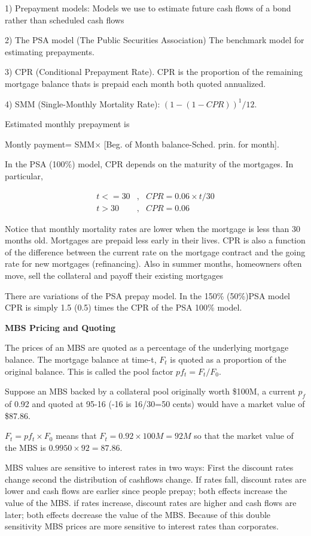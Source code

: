 \documentclass[a4paper,11pt]{article}
\begin{document}
1) Prepayment models: Models we use to estimate future cash flows of
a bond rather than scheduled cash flows

2) The PSA model (The Public Securities Association) The benchmark
model for estimating prepayments.

3) CPR (Conditional Prepayment Rate). CPR is the proportion of the
remaining mortgage balance thats is prepaid each month both quoted
annualized.

4) SMM (Single-Monthly Mortality Rate): $(1-(1-CPR))^1/12$.


Estimated monthly prepayment is

Montly payment= SMM$\times$ [Beg. of Month balance-Sched. prin. for
month].

In the PSA (100\%) model, CPR depends on the maturity of the
mortgages. In particular,

\begin{eqnarray}
  t<=30 &,& CPR =0.06\times t/30\\
  t> 30&,& CPR =0.06
\end{eqnarray}

Notice that monthly mortality rates are lower when the mortgage is
less than 30 months old.  Mortgages are prepaid less early in their
lives. CPR is also a function of the difference between the current
rate on the mortgage contract and the going rate for new mortgages
(refinancing). Also in summer months, homeowners often move, sell
the collateral and payoff their existing mortgages

There are variations of the PSA prepay model. In the 150\% (50\%)PSA
model CPR is simply 1.5 (0.5) times the CPR of the PSA 100\% model.

{\bf MBS Pricing and Quoting}

The prices of an MBS are quoted as a percentage of the underlying
mortgage balance. The mortgage balance at time-t, $F_t$ is quoted as
a proportion of the original balance. This is called the pool factor
$pf_t= F_t/F_0$.

Suppose an MBS backed by a collateral pool originally worth \$100M,
a current $p_f$ of 0.92 and quoted at 95-16 (-16 is 16/30=50 cents)
would have a market value of \$87.86.

$F_t=pf_t\times F_0$ means that $F_t=0.92\times100M=92M$ so that the
market value of the MBS is $0.9950\times92 =87.86$.

MBS values are sensitive to interest rates in two ways: First the
discount rates change second the distribution of cashflows change.
If rates fall, discount rates are lower and cash flows are earlier
since people prepay; both effects increase the value of the MBS. if
rates increase, discount rates are higher and cash flows are later;
both effects decrease the value of the MBS. Because of this double
sensitivity MBS prices are more sensitive to interest rates than
corporates.
\end{document}
